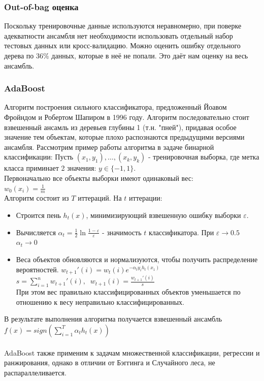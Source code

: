 \documentclass{article}
\begin{document}
        \subsubsection*{Out-of-bag оценка} 
            Поскольку тренировочные данные используются неравномерно, при поверке адекватности ансамбля нет необходимости использовать отдельный набор тестовых данных или кросс-валидацию. Можно оценить ошибку отдельного дерева по $36\%$ данных, которые в неё не попали. Это даёт нам оценку на весь ансамбль.
        
        \subsubsection*{AdaBoost \citep{freund1997decision}}
            Алгоритм построения сильного классификатора, предложенный Йоавом Фройндом и Робертом Шапиром в 1996 году. Алгоритм последовательно стоит взвешенный ансамль из деревьев глубины 1 (т.н. "пней"), придавая особое значение тем объектам, которые плохо распознаются предыдущими версиями ансамбля.
            Рассмотрим пример работы алгоритма в задаче бинарной классификации:
            Пусть $(x_1, y_1), \dots, (x_k, y_k)$ - тренировочная выборка, где метка класса приминает 2 значения: $y \in \{-1, 1\}$. \\
            Первоначально все объекты выборки имеют одинаковый вес: \\
            $w_0(x_i) = \frac{1}{m}$ \\
            Алгоритм состоит из $T$ иттераций. На $t$ иттерации: \\
            \begin{itemize}
                \item Строится пень $h_t(x)$, минимизирующий взвешенную ошибку выборки $\varepsilon$.
                \item Вычисляется $\alpha_t = \frac{1}{2}\ln \frac{1 - \varepsilon}{\varepsilon}$ - значимость $t$ классификатора. При $\varepsilon \rightarrow 0.5$  $\alpha_t \rightarrow 0$ 
                \item Веса объектов обновляются и нормализуются, чтобы получить распределение вероятностей. 
                $w_{t+1}'(i) = w_t(i)e^{- \alpha_t y_i h_t(x_1)}$ \\
                $s = \sum\limits_{i = 1}^n w_{t+1}' (i), \;\; w_{t+1} (i) = \frac{w_{t+1}' (i)}{s}$ \\
                При этом вес правильно классифицированных объектов уменьшается по отношению к весу неправильно классифицированных.
            \end{itemize}
            В результате выполнения алгоритма получается взвешенный ансамбль
            $f(x) = sign \left( \sum\limits_{i = 1}^T \alpha_t h_t(x) \right)$
            \\\\
            AdaBoost также применим к задачам множественной классификации, регрессии и ранжирования, однако в отличии от Бэггинга и Случайного леса, не распараллеливается. 
            
\end{document}
